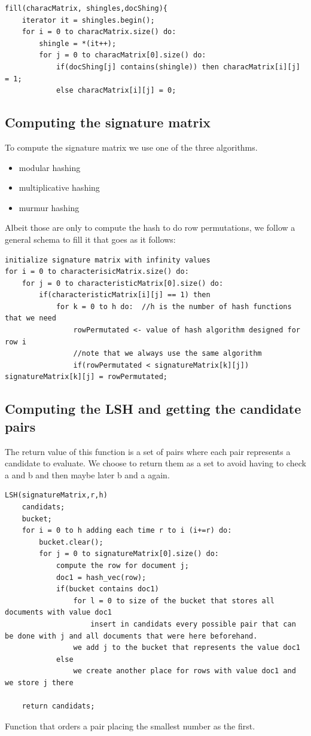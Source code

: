 \documentclass[12pt]{article}
\begin{document}
 
\begin{lstlisting}
fill(characMatrix, shingles,docShing){
    iterator it = shingles.begin();
    for i = 0 to characMatrix.size() do:
        shingle = *(it++);
        for j = 0 to characMatrix[0].size() do:
            if(docShing[j] contains(shingle)) then characMatrix[i][j] = 1;
            else characMatrix[i][j] = 0;
\end{lstlisting}
\medskip

\subsection{Computing the signature matrix}
To compute the signature matrix we use one of the three algorithms.
\begin{itemize}
\item modular hashing
\item multiplicative hashing
\item murmur hashing 
\end{itemize}
Albeit those are only to compute the hash to do row permutations, we follow a general schema to fill it that goes as it follows:
\begin{lstlisting}
initialize signature matrix with infinity values
for i = 0 to characterisicMatrix.size() do:
	for j = 0 to characteristicMatrix[0].size() do:
		if(characteristicMatrix[i][j] == 1) then
			for k = 0 to h do:	//h is the number of hash functions that we need
				rowPermutated <- value of hash algorithm designed for row i
				//note that we always use the same algorithm
				if(rowPermutated < signatureMatrix[k][j]) signatureMatrix[k][j] = rowPermutated;
\end{lstlisting}
\medskip


\subsection{Computing the LSH and getting the candidate pairs}
The return value of this function is a set of pairs where each pair represents a candidate to evaluate. We choose to return them as a set to avoid having to check a and b and then maybe later b and a again.
\begin{lstlisting}
LSH(signatureMatrix,r,h)
    candidats;                     
    bucket;
    for i = 0 to h adding each time r to i (i+=r) do:
        bucket.clear();
        for j = 0 to signatureMatrix[0].size() do:
            compute the row for document j;
            doc1 = hash_vec(row);
            if(bucket contains doc1)
                for l = 0 to size of the bucket that stores all documents with value doc1 
                    insert in candidats every possible pair that can be done with j and all documents that were here beforehand.
                we add j to the bucket that represents the value doc1
            else
                we create another place for rows with value doc1 and we store j there

    return candidats;

 \end{lstlisting}
\begin{large}
Function that orders a pair placing the smallest number as the first.
\end{large}
\end{document}
